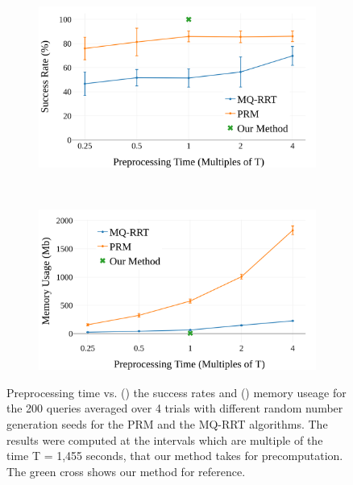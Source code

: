 \documentclass[letterpaper]{article} %
\begin{document}
\begin{figure}
    \centering
    \begin{subfigure}[b]{0.45\textwidth}
        \includegraphics[width=\textwidth]{success.png}
        \caption{}
        \label{fig:success}
    \end{subfigure}
    ~ %
    \begin{subfigure}[b]{0.45\textwidth}
        \includegraphics[width=\textwidth]{memory.png}
        \caption{}
        \label{fig:memory}
    \end{subfigure}
    \caption{Preprocessing time vs. () the success rates and () memory useage for the 200 queries averaged over 4 trials with different random number generation seeds for the \textsf{PRM} and the \textsf{MQ-RRT} algorithms. The results were computed at the intervals which are multiple of the time T = 1,455 seconds, that our method takes for precomputation. The green cross shows our method for reference.}
    \label{fig:plots}
\end{figure}
\end{document}
